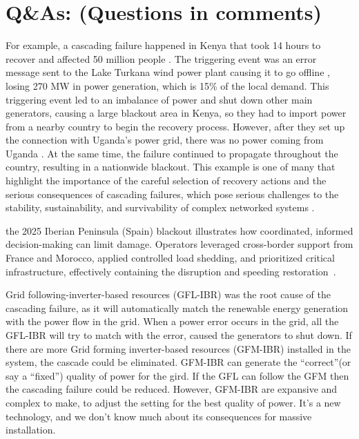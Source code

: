 \section{Q\&As: (Questions in comments) }
For example, a cascading failure happened in Kenya \cite{apkenya_dec23} that took 14 hours to recover and affected 50 million people \cite{apkenya_dec23}. The triggering event was an error message sent to the Lake Turkana wind power plant causing it to go offline \cite{apkenya_dec23}, losing 270 MW in power generation, which is 15\% of the local demand. This triggering event led to an imbalance of power and shut down other main generators, causing a large blackout area in Kenya, so they had to import power from a nearby country to begin the recovery process. However, after they set up the connection with Uganda's power grid, there was no power coming from Uganda \cite{apkenya_aug23}. At the same time, the failure continued to propagate throughout the country, resulting in a nationwide blackout. This example is one of many that highlight the importance of the careful selection of recovery actions and the serious consequences of cascading failures, which pose serious challenges to the stability, sustainability, and survivability of complex networked systems \cite{xiaohui_review_2016}. 

the 2025 Iberian Peninsula (Spain) blackout illustrates how coordinated, informed decision-making can limit damage. Operators leveraged cross-border support from France and Morocco, applied controlled load shedding, and prioritized critical infrastructure, effectively containing the disruption and speeding restoration~\cite{cetinkaya_technical_2025}.

Grid following-inverter-based resources (GFL-IBR) was the root cause of the cascading failure, as it will automatically match the renewable energy generation with the power flow in the grid. When a power error occurs in the grid, all the GFL-IBR will try to match with the error, caused the generators to shut down.
If there are more Grid forming inverter-based resources (GFM-IBR) installed in the system, the cascade could be eliminated. GFM-IBR can generate the “correct”(or say a “fixed”) quality of power for the gird. If the GFL can follow the GFM then the cascading failure could be reduced.
However, GFM-IBR are expansive and complex to make, to adjust the setting for the best quality of power. It’s a new technology, and we don’t know much about its consequences for massive installation.


